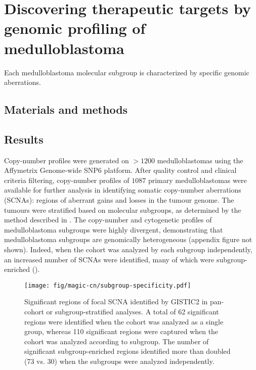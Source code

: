 \chapter{Discovering therapeutic targets by genomic profiling of medulloblastoma}

\begin{hypothesis}
Each medulloblastoma molecular subgroup is characterized by specific genomic aberrations.
\end{hypothesis}

\section{Materials and methods}

\section{Results}

Copy-number profiles were generated on $> 1200$ medulloblastomas using the Affymetrix Genome-wide SNP6 platform. After quality control and clinical criteria filtering, copy-number profiles of $1087$ primary medulloblastomas were available for further analysis in identifying somatic copy-number aberrations (SCNAs): regions of aberrant gains and losses in the tumour genome. The tumours were stratified based on molecular subgroups, as determined by the method described in . The copy-number and cytogenetic profiles of medulloblastoma subgroups were highly divergent, demonstrating that medulloblastoma subgroups are genomically heterogeneous (appendix figure not shown). Indeed, when the cohort was analyzed by each subgroup independently, an increased number of SCNAs were identified, many of which were subgroup-enriched ().

\begin{SCfigure}[5]
	\centering
	\texttt{[image: fig/magic-cn/subgroup-specificity.pdf]}
	\caption[Significant regions of focal SCNA identified by GISTIC2]
	{
	Significant regions of focal SCNA identified by GISTIC2 in pan-cohort or subgroup-stratified analyses.
	A total of 62 significant regions were identified when the cohort was analyzed as a single group, whereas 110 significant regions were captured when the cohort was analyzed according to subgroup. The number of significant subgroup-enriched regions identified more than doubled (73 vs. 30) when the subgroups were analyzed independently.
	}
	\label{fig:subgroup-specificity}
\end{SCfigure}

